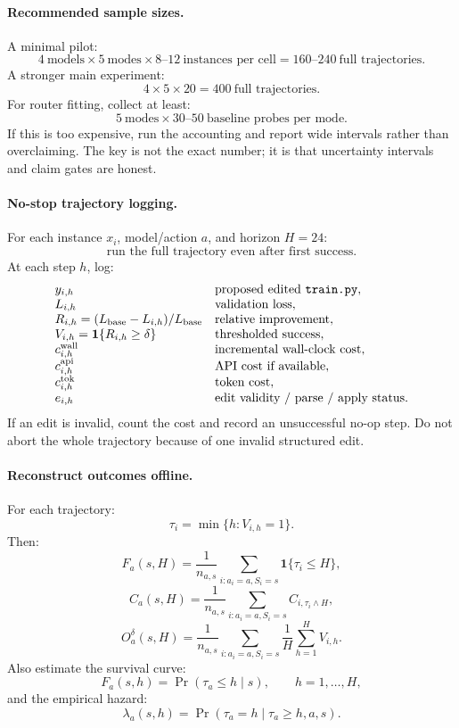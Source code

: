 \documentclass{article}
\begin{document}
\paragraph{Recommended sample sizes.}
A minimal pilot:
\[
    4\ \text{models}
    \times
    5\ \text{modes}
    \times
    8\text{--}12\ \text{instances per cell}
    =
    160\text{--}240\ \text{full trajectories}.
\]
A stronger main experiment:
\[
    4
    \times
    5
    \times
    20
    =
    400\ \text{full trajectories}.
\]
For router fitting, collect at least:
\[
    5\ \text{modes}\times 30\text{--}50\ \text{baseline probes per mode}.
\]
If this is too expensive, run the accounting and report wide intervals rather than overclaiming.
The key is not the exact number; it is that uncertainty intervals and claim gates are honest.

\paragraph{No-stop trajectory logging.}
For each instance \(x_i\), model/action \(a\), and horizon \(H=24\):
\[
    \text{run the full trajectory even after first success}.
\]
At each step \(h\), log:
\[
\begin{array}{ll}
    y_{i,h} & \text{proposed edited \texttt{train.py}},\\
    L_{i,h} & \text{validation loss},\\
    R_{i,h}=(L_{\mathrm{base}}-L_{i,h})/L_{\mathrm{base}} & \text{relative improvement},\\
    V_{i,h}=\mathbf 1\{R_{i,h}\ge \delta\} & \text{thresholded success},\\
    c_{i,h}^{\mathrm{wall}} & \text{incremental wall-clock cost},\\
    c_{i,h}^{\mathrm{api}} & \text{API cost if available},\\
    c_{i,h}^{\mathrm{tok}} & \text{token cost},\\
    e_{i,h} & \text{edit validity / parse / apply status}.
\end{array}
\]
If an edit is invalid, count the cost and record an unsuccessful no-op step.
Do not abort the whole trajectory because of one invalid structured edit.

\paragraph{Reconstruct outcomes offline.}
For each trajectory:
\[
    \tau_i
    =
    \min\{h:V_{i,h}=1\}.
\]
Then:
\[
    F_a(s,H)
    =
    \frac{1}{n_{a,s}}\sum_{i:a_i=a,S_i=s}
    \mathbf 1\{\tau_i\le H\},
\]
\[
    C_a(s,H)
    =
    \frac{1}{n_{a,s}}\sum_{i:a_i=a,S_i=s}
    C_{i,\tau_i\wedge H},
\]
\[
    O_a^\delta(s,H)
    =
    \frac{1}{n_{a,s}}\sum_{i:a_i=a,S_i=s}
    \frac{1}{H}\sum_{h=1}^H V_{i,h}.
\]
Also estimate the survival curve:
\[
    F_a(s,h)
    =
    \Pr(\tau_a\le h\mid s),
    \qquad
    h=1,\ldots,H,
\]
and the empirical hazard:
\[
    \lambda_a(s,h)
    =
    \Pr(\tau_a=h\mid \tau_a\ge h,a,s).
\]
\end{document}
